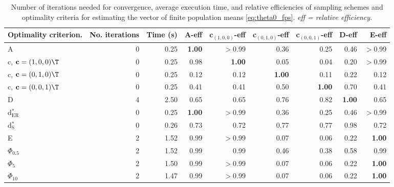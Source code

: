 \begin{table}[htb!]
\centering
\caption{Number of iterations needed for convergence, average execution time, and relative efficiencies of sampling schemes and optimality criteria for estimating the vector of finite population means \eqref{eq:theta0_fps}. \textit{eff = relative efficiency.}} 
\label{tab:finite_population_inference}
\begin{tabular}{lrrrrrrrr}
 Optimality criterion. & No. iterations & Time (s) & A-eff & c$_{(1,0,0)}$-eff & c$_{(0,1,0)}$-eff & c$_{(0,0,1)}$-eff & D-eff & E-eff \\ 
  \hline
A & 0 & 0.25 & \textbf{1.00} & $>$0.99 & 0.36 & 0.25 & 0.46 & $>$0.99 \\ 
  c, $\mathbf{c} = (1,0,0)\T$ & 0 & 0.25 & 0.98 & \textbf{1.00} & 0.05 & 0.04 & 0.20 & $>$0.99 \\ 
  c, $\mathbf{c} = (0,1,0)\T$ & 0 & 0.25 & 0.12 & 0.12 & \textbf{1.00} & 0.11 & 0.22 & 0.12 \\ 
  c, $\mathbf{c} = (0,0,1)\T$ & 0 & 0.25 & 0.41 & 0.41 & 0.50 & \textbf{1.00} & 0.70 & 0.41 \\ 
  D & 4 & 2.50 & 0.65 & 0.65 & 0.76 & 0.82 & \textbf{1.00} & 0.65 \\ 
  d$^*_{\mathrm{ER}}$ & 0 & 0.25 & \textbf{1.00} & $>$0.99 & 0.36 & 0.25 & 0.46 & $>$0.99 \\ 
  d$^*_{\mathrm{S}}$ & 0 & 0.26 & 0.73 & 0.72 & 0.77 & 0.77 & 0.98 & 0.72 \\ 
  E & 2 & 1.52 & 0.99 & $>$0.99 & 0.07 & 0.06 & 0.22 & \textbf{1.00} \\ 
  $\Phi_{0.5}$ & 2 & 1.52 & 0.99 & 0.99 & 0.46 & 0.38 & 0.58 & 0.99 \\ 
  $\Phi_5$ & 2 & 1.50 & 0.99 & $>$0.99 & 0.07 & 0.06 & 0.22 & \textbf{1.00} \\ 
  $\Phi_{10}$ & 2 & 1.47 & 0.99 & $>$0.99 & 0.07 & 0.06 & 0.22 & \textbf{1.00} \\ 
   \hline
\end{tabular}
\end{table}
